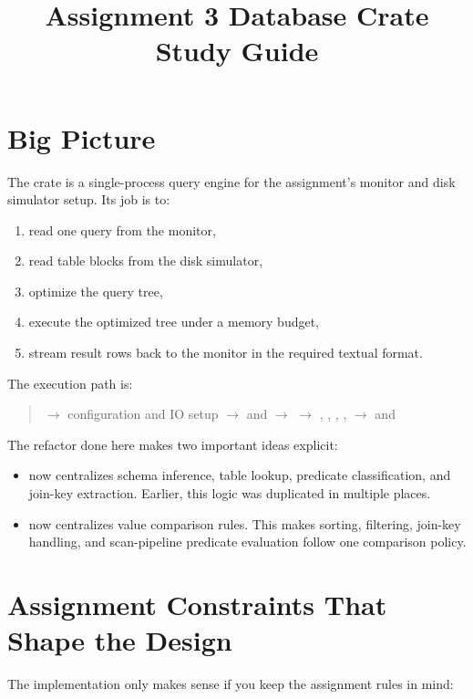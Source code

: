 \documentclass[11pt]{article}
\title{Assignment 3 Database Crate Study Guide}
\date{}
\begin{document}
\maketitle
\tableofcontents

\section{Big Picture}
The  crate is a single-process query engine for the assignment's monitor and disk simulator setup. Its job is to:

\begin{enumerate}[leftmargin=*]
    \item read one query from the monitor,
    \item read table blocks from the disk simulator,
    \item optimize the query tree,
    \item execute the optimized tree under a memory budget,
    \item stream result rows back to the monitor in the required textual format.
\end{enumerate}

The execution path is:

\begin{quote}
 $\rightarrow$ configuration and IO setup $\rightarrow$
 and  $\rightarrow$
 $\rightarrow$
, , , ,  $\rightarrow$
 and 
\end{quote}

The refactor done here makes two important ideas explicit:

\begin{itemize}[leftmargin=*]
    \item {} now centralizes schema inference, table lookup, predicate classification, and join-key extraction. Earlier, this logic was duplicated in multiple places.
    \item {} now centralizes value comparison rules. This makes sorting, filtering, join-key handling, and scan-pipeline predicate evaluation follow one comparison policy.
\end{itemize}

\section{Assignment Constraints That Shape the Design}
The implementation only makes sense if you keep the assignment rules in mind:
\end{document}
